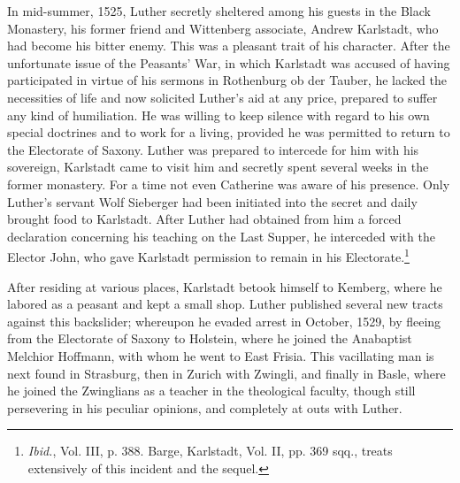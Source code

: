 In mid-summer, 1525, Luther secretly sheltered among his guests
in the Black Monastery, his former friend and Wittenberg associate,
Andrew Karlstadt, who had become his bitter enemy. This was a
pleasant trait of his character. After the unfortunate issue of the
Peasants’ War, in which Karlstadt was accused of having participated
in virtue of his sermons in Rothenburg ob der Tauber, he lacked the
necessities of life and now solicited Luther’s aid at any price, prepared
to suffer any kind of humiliation. He was willing to keep
silence with regard to his own special doctrines and to work for
a living, provided he was permitted to return to the Electorate of
Saxony. Luther was prepared to intercede for him with his sovereign,
Karlstadt came to visit him and secretly spent several weeks in the
former monastery. For a time not even Catherine was aware of
his presence. Only Luther’s servant Wolf Sieberger had been initiated
into the secret and daily brought food to Karlstadt. After Luther
had obtained from him a forced declaration concerning his teaching
on the Last Supper, he interceded with the Elector John, who gave
Karlstadt permission to remain in his Electorate.\footnote
{\textit{Ibid.}, Vol. III, p. 388. Barge, Karlstadt, Vol. II, pp. 369 sqq., treats extensively of this
incident and the sequel.}

After residing at various places, Karlstadt betook himself to
Kemberg, where he labored as a peasant and kept a small shop. Luther
published several new tracts against this backslider; whereupon he
evaded arrest in October, 1529, by fleeing from the Electorate of
Saxony to Holstein, where he joined the Anabaptist Melchior Hoffmann,
with whom he went to East Frisia. This vacillating man is
next found in Strasburg, then in Zurich with Zwingli, and finally
in Basle, where he joined the Zwinglians as a teacher in the theological
faculty, though still persevering in his peculiar opinions, and completely
at outs with Luther.

